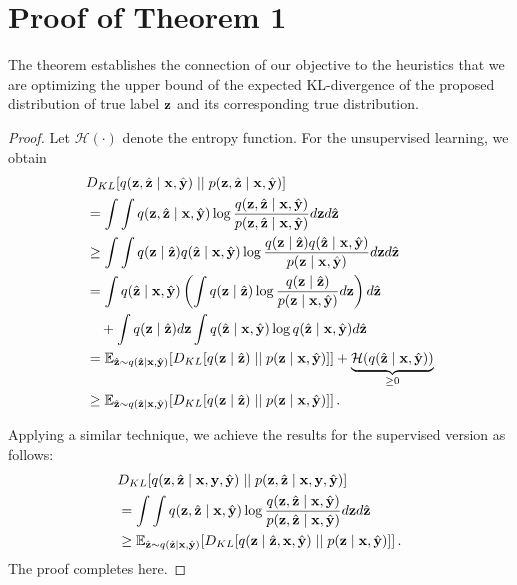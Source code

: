 {\appendices
\section{Proof of Theorem 1}
The theorem establishes the connection of our objective to the heuristics that we are optimizing the upper bound of the expected KL-divergence of the proposed distribution of true label $\z$ and its corresponding true distribution.

\begin{proof}
Let $\mathcal{H}(\cdot)$ denote the entropy function.
For the unsupervised learning, we obtain
\begin{align*}
&\kl[ q(\z, \zhat \mid \x, \yhat) \mid\mid p(\z, \zhat \mid \x, \yhat)] \\
&= \int \int q(\z, \zhat \mid \x, \yhat) \log \frac{q(\z, \zhat \mid \x, \yhat)}{p(\z, \zhat \mid \x, \yhat)} d\z d\zhat \\
&\ge \int \int q(\z \mid \zhat) q(\zhat \mid \x, \yhat) \log \frac{q(\z \mid \zhat) q(\zhat \mid \x, \yhat)}{p(\z \mid \x, \yhat)} d\z d\zhat \\
&= \int q(\zhat \mid \x, \yhat) \left( \int q(\z \mid \zhat) \log \frac{q(\z \mid \zhat)}{p(\z \mid \x, \yhat)} d\z \right) d\zhat \\
&\quad + \int q(\z \mid \zhat) d\z  \int q(\zhat \mid \x, \yhat)\log q(\zhat \mid \x, \yhat) d\zhat \\
&= \E_{\zhat \sim q(\zhat \mid \x, \yhat)}[\kl[q(\z \mid \zhat) \mid\mid p(\z \mid \x, \yhat) ]] + \underbrace{\mathcal{H}(q(\zhat \mid \x, \yhat))}_{\ge 0} \\
&\ge \E_{\zhat \sim q(\zhat \mid \x, \yhat)}[\kl[q(\z \mid \zhat) \mid\mid p(\z \mid \x, \yhat) ]] \,.
\end{align*}
 
Applying a similar technique, we achieve the results for the supervised version as follows:
\begin{align*}
&\kl[ q(\z, \zhat \mid \x, \y, \yhat) \mid\mid p(\z, \zhat \mid \x, \y, \yhat)] \\
&= \int \int q(\z, \zhat \mid \x, \yhat) \log \frac{q(\z, \zhat \mid \x, \yhat)}{p(\z, \zhat \mid \x, \yhat)} d\z d\zhat \\
&\ge \E_{\zhat \sim q(\zhat \mid \x, \yhat)}[\kl[q(\z \mid \zhat, \x, \yhat) \mid\mid p(\z \mid \x, \yhat) ]] \,.
\end{align*}
The proof completes here.
\end{proof}

}
